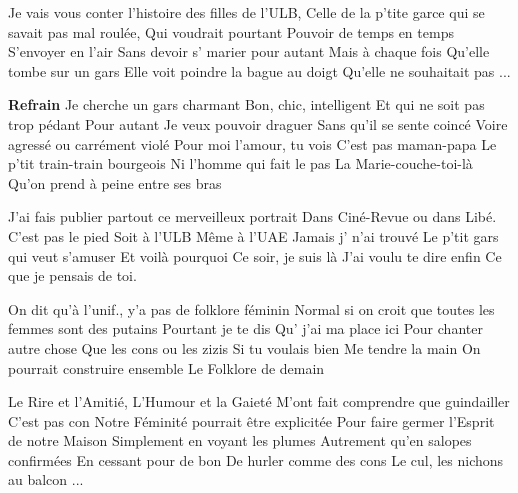 \footnotemark [ititle={Masculin Singulier}, tu={Le rire du sergent (Michel Sardou)}]


\beginverse
Je vais vous conter l'histoire des filles de l'ULB,
Celle de la p'tite garce qui se savait pas mal roulée,
Qui voudrait pourtant
Pouvoir de temps en temps
S'envoyer en l'air
Sans devoir s' marier pour autant
Mais à chaque fois
Qu'elle tombe sur un gars
Elle voit poindre la bague au doigt
Qu'elle ne souhaitait pas ...
\endverse

\beginchorus
\textbf{Refrain}
Je cherche un gars charmant
Bon, chic, intelligent
Et qui ne soit pas trop pédant
Pour autant
Je veux pouvoir draguer
Sans qu'il se sente coincé
Voire agressé ou carrément violé
Pour moi l'amour, tu vois
C'est pas maman-papa
Le p'tit train-train bourgeois
Ni l'homme qui fait le pas
La Marie-couche-toi-là
Qu'on prend à peine entre ses bras
\endchorus

\beginverse
J'ai fais publier partout ce merveilleux portrait
Dans Ciné-Revue ou dans Libé.
C'est pas le pied
Soit à l'ULB
Même à l'UAE
Jamais j' n'ai trouvé
Le p'tit gars qui veut s'amuser
Et voilà pourquoi
Ce soir, je suis là
J'ai voulu te dire enfin
Ce que je pensais de toi.
\endverse

\beginverse
On dit qu'à l'unif., y'a pas de folklore féminin
Normal si on croit que toutes les femmes sont des putains
Pourtant je te dis
Qu' j'ai ma place ici
Pour chanter autre chose
Que les cons ou les zizis
Si tu voulais bien
Me tendre la main
On pourrait construire ensemble
Le Folklore de demain
\endverse

\beginverse
Le Rire et l'Amitié,
L'Humour et la Gaieté
M'ont fait comprendre que guindailler
C'est pas con
Notre Féminité pourrait être explicitée
Pour faire germer l'Esprit de notre Maison
Simplement en voyant les plumes
Autrement qu'en salopes confirmées
En cessant pour de bon
De hurler comme des cons
Le cul, les nichons au balcon ...
\endverse
\endsong